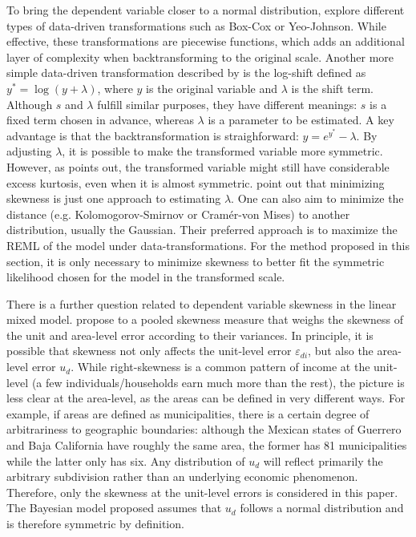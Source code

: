 To bring the dependent variable closer to a normal distribution, \cite{rojas_perilla_data_2020} explore different types of data-driven transformations such as Box-Cox or Yeo-Johnson.
While effective, these transformations are piecewise functions, which adds an additional layer of complexity when backtransforming to the original scale.
Another more simple data-driven transformation described by \cite{rojas_perilla_data_2020} is the log-shift defined as $y^* = \log(y + \lambda)$, where $y$ is the original variable and $\lambda$ is the shift term. Although $s$ and $\lambda$ fulfill similar purposes, they have different meanings: $s$ is a fixed term chosen in advance, whereas $\lambda$ is a parameter to be estimated.
A key advantage is that the backtransformation is straighforward: $y = e^{y^*} - \lambda$.
By adjusting $\lambda$, it is possible to make the transformed variable more symmetric.
However, as \cite{morelli_hierarchical_2021} points out, the transformed variable might still have considerable excess kurtosis, even when it is almost symmetric.
\cite{rojas_perilla_data_2020} point out that minimizing skewness is just one approach to estimating $\lambda$.
One can also aim to minimize the distance (e.g. Kolomogorov-Smirnov or Cramér-von Mises) to another distribution, usually the Gaussian.
Their preferred approach is to maximize the REML of the model under data-transformations.
For the method proposed in this section, it is only necessary to minimize skewness to better fit the symmetric likelihood chosen for the model in the transformed scale.

There is a further question related to dependent variable skewness in the linear mixed model.
\cite{rojas_perilla_data_2020} propose to a pooled skewness measure that weighs the skewness of the unit and area-level error according to their variances.
In principle, it is possible that skewness not only affects the unit-level error $\varepsilon_{di}$, but also the area-level error $u_{d}$.
While right-skewness is a common pattern of income at the unit-level (a few individuals/households earn much more than the rest), the picture is less clear at the area-level, as the areas can be defined in very different ways.
For example, if areas are defined as municipalities, there is a certain degree of arbitrariness to geographic boundaries:
although the Mexican states of Guerrero and Baja California have roughly the same area, the former has 81 municipalities while the latter only has six.
Any distribution of $u_d$ will reflect primarily the arbitrary subdivision rather than an underlying economic phenomenon.
Therefore, only the skewness at the unit-level errors is considered in this paper.
The Bayesian model proposed assumes that $u_d$ follows a normal distribution and is therefore symmetric by definition.

